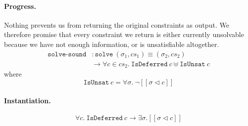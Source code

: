 \documentclass[sigplan,screen,review]{acmart}
\begin{document}
\paragraph{Progress.}

Nothing prevents us from returning the original constraints as output.
We therefore promise that every constraint we return is either currently
unsolvable because we have not enough information, or is unsatisfiable
altogether. \[
\begin{aligned}
\texttt{solve-sound}
&: \texttt{solve}~(\sigma_1, cs_1) \equiv (\sigma_2, cs_2) \\
&\to \forall c \in cs_2. ~ \texttt{IsDeferred}~c \uplus \texttt{IsUnsat}~c
\end{aligned}
\] where \[
\texttt{IsUnsat}~c = \forall \sigma. ~ \neg [\![ \sigma \triangleleft c ]\!]
\]

\paragraph{Instantiation.}

\[
\forall c. ~ \texttt{IsDeferred}~c \to \exists \sigma. [\![ \sigma \triangleleft c ]\!]
\]



\end{document}
